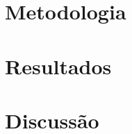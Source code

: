 \documentclass[article,11pt,a4paper,brazil]{abntex2}
\begin{document}
	
	\section{Metodologia}
	
	\newpage
	\thispagestyle{plain}
	\section{Resultados}
	
	\lipsum[1]
	
	
	\section{Discussão}
	
	
	
	\lipsum[3]
	
	\postextual
	
	
	
	
\end{document}
